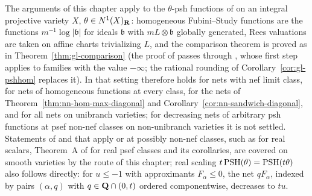 \begin{remark}\label{rmk:nn-bj22-setting}
\notready
{}
The arguments of this chapter apply to the $\theta$-psh functions of \cite[Definition~4.1]{BJ22} on an integral projective variety $X$, $\theta\in N^1(X)_{\mathbf{R}}$:
homogeneous Fubini--Study functions are the functions $m^{-1}\log|\mathfrak b|$ for ideals $\mathfrak b$ with $mL\otimes\mathfrak b$ globally generated, Rees valuations are taken
on affine charts trivializing $L$, and the comparison theorem is proved as in Theorem~\ref{thm:gl-comparison} (the proof of \cite[Theorem~4.22]{BJ22} passes through
\cite[Theorem~4.15(i)]{BJ22}, whose first step applies \cite[Lemma~4.6]{BJ22} to families with the value $-\infty$; the rational rounding of
Corollary~\ref{cor:gl-pshhom} replaces it). In that setting \cite[Theorem~4.5]{BJ22} therefore holds for nets with nef limit class, for nets of homogeneous
functions at every class, for the nets of Theorem~\ref{thm:nn-hom-max-diagonal} and Corollary~\ref{cor:nn-sandwich-diagonal}, and for all nets on unibranch varieties; for
decreasing nets of arbitrary psh functions at psef non-nef classes on non-unibranch varieties it is not settled. Statements of \cite{BJ22} and \cite{BJadd} that apply
\cite[Theorem~4.5]{BJ22} or \cite[Lemma~5.9]{BJ22} at possibly non-nef classes, such as \cite[Theorem~4.7(i)]{BJ22} for real scalars, Theorem~A of \cite{BJadd} for real
psef classes and its corollaries, are covered on smooth varieties by the route of this chapter; real scaling $t\operatorname{PSH}(\theta)=\operatorname{PSH}(t\theta)$ also follows directly: for
$u\le-1$ with approximants $F_\alpha\le0$, the net $qF_\alpha$, indexed by pairs $(\alpha,q)$ with $q\in\mathbf{Q}\cap(0,t)$ ordered componentwise, decreases to $tu$.
\end{remark}

